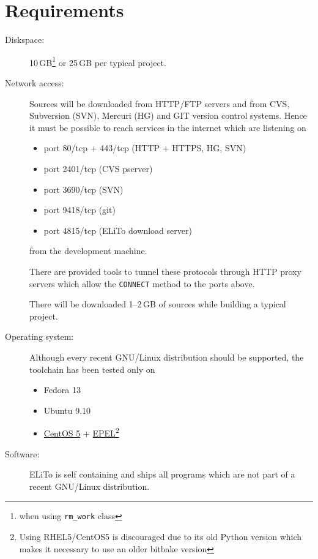 \chapter{Requirements}
\label{chap:reqs}

\begin{description}
\item[Diskspace:] 10\,GB\footnote{when using \texttt{rm\_work} class}
  or 25\,GB per typical project.
\item[Network access:] Sources will be downloaded from HTTP/FTP
  servers and from CVS, Subversion (SVN), Mercuri (HG) and GIT version
  control systems. Hence it must be possible to reach services in the
  internet which are listening on
  \begin{itemize}
  \item port 80/tcp + 443/tcp  (HTTP + HTTPS, HG, SVN)
  \item port 2401/tcp (CVS pserver)
  \item port 3690/tcp (SVN)
  \item port 9418/tcp (git)
  \item port 4815/tcp (ELiTo download server)
  \end{itemize}
  from the development machine.

  There are provided tools to tunnel these protocols through HTTP
  proxy servers which allow the \texttt{CONNECT} method to the ports
  above.

  There will be downloaded 1--2\,GB of sources while building a
  typical project.
\item[Operating system:] Although every recent GNU/Linux distribution
  should be supported, the toolchain has been tested only on
  \begin{itemize}
  \item Fedora 13
  \item Ubuntu 9.10
  \item \href{http://centos.org}{CentOS 5} +
    \href{https://fedoraproject.org/wiki/EPEL}{EPEL}\footnote{Using
      RHEL5/CentOS5 is discouraged due to its old Python version which
      makes it necessary to use an older bitbake version}
  \end{itemize}
\item[Software:] ELiTo is self containing and ships all programs which
  are not part of a recent GNU/Linux distribution.
\end{description}
